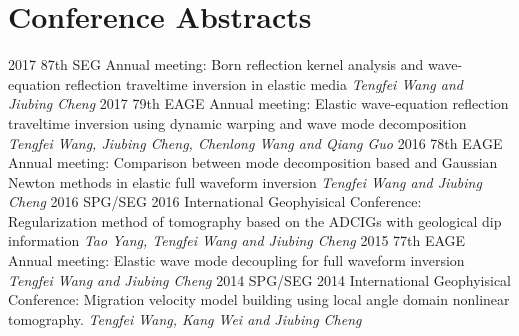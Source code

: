 \documentclass[]{friggeri-encvblackwhite}
\begin{document}
\section{Conference Abstracts}
\begin{entrylist}
  \entry
    {2017}
	{87th SEG Annual meeting: Born reflection kernel analysis and wave-equation reflection
	traveltime inversion in elastic media}
	{\emph{Tengfei Wang and Jiubing Cheng }}
  \entry
    {2017}
	{79th EAGE Annual meeting: Elastic wave-equation reflection traveltime inversion
	using dynamic warping and wave mode decomposition}
	{\emph{Tengfei Wang, Jiubing Cheng, Chenlong Wang and Qiang Guo }}
  \entry
    {2016}
	{78th EAGE Annual meeting: Comparison between mode decomposition based and Gaussian
	Newton methods in elastic full waveform inversion}
	{\emph{Tengfei Wang and Jiubing Cheng}}
  \entry
    {2016}
	{SPG/SEG 2016 International Geophyisical Conference: Regularization method of 
	tomography based on the ADCIGs 	with geological dip information}
	{\emph{Tao Yang, Tengfei Wang and Jiubing Cheng }}
  \entry
    {2015}
	{77th EAGE Annual meeting: Elastic wave mode decoupling for full waveform
	inversion}
	{\emph{Tengfei Wang and Jiubing Cheng }}
  \entry
    {2014}
	{SPG/SEG 2014 International Geophyisical Conference: Migration velocity model building 
	using local angle domain nonlinear tomography.}
	{\emph{Tengfei Wang, Kang Wei and Jiubing Cheng }}
\end{entrylist}
\end{document}
